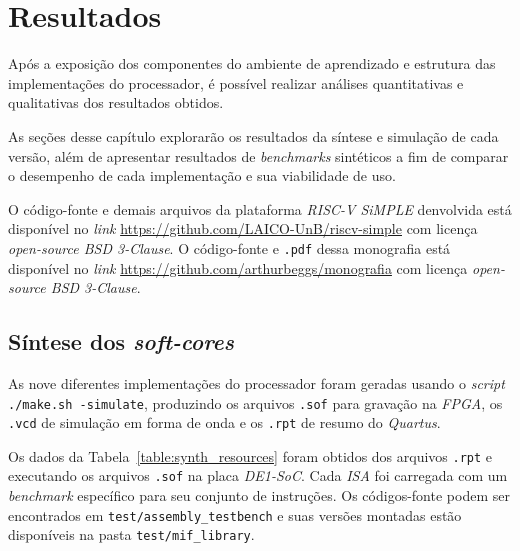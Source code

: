 \chapter{Resultados}\label{cap4_resultados}

{ Após a exposição dos componentes do ambiente de aprendizado e estrutura das
    implementações do processador, é possível realizar análises quantitativas
    e qualitativas dos resultados obtidos.
}

{ As seções desse capítulo explorarão os resultados da síntese e simulação de
    cada versão, além de apresentar resultados de \textit{benchmarks} sintéticos
    a fim de comparar o desempenho de cada implementação e sua viabilidade de uso.
}

{ O código-fonte e demais arquivos da plataforma \textit{RISC-V SiMPLE} denvolvida
    está disponível no \textit{link} \url{https://github.com/LAICO-UnB/riscv-simple}
    com licença \textit{open-source BSD 3-Clause}. O código-fonte e \texttt{.pdf}
    dessa monografia está disponível no \textit{link} \url{https://github.com/arthurbeggs/monografia}
    com licença \textit{open-source BSD 3-Clause}.
}

\section{Síntese dos \textit{soft-cores}}
    { As nove diferentes implementações do processador foram geradas usando o \textit{script}
        \texttt{./make.sh \--simulate}, produzindo os arquivos \texttt{.sof} para
        gravação na \textit{FPGA}, os \texttt{.vcd} de simulação em forma de onda
        e os \texttt{.rpt} de resumo do \textit{Quartus}.
    }

    { Os dados da Tabela~\ref{table:synth_resources} foram obtidos dos arquivos
        \texttt{.rpt} e executando os arquivos \texttt{.sof} na placa \textit{DE1-SoC}.
        Cada \textit{ISA} foi carregada com um \textit{benchmark} específico para seu
        conjunto de instruções. Os códigos-fonte podem ser encontrados em
        \texttt{test/assembly\_testbench} e suas versões montadas estão disponíveis
        na pasta \texttt{test/mif\_library}.
    }

